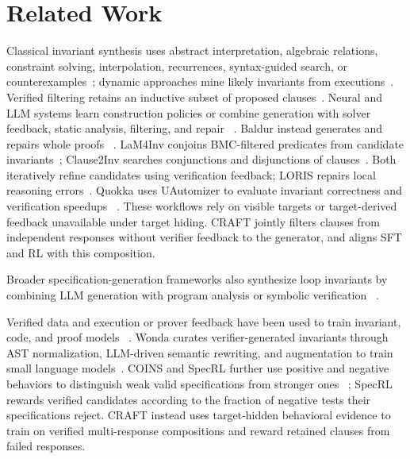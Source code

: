 \section{Related Work}\label{sec:related}

Classical invariant synthesis uses abstract interpretation, algebraic relations,
constraint solving, interpolation, recurrences, syntax-guided search, or
counterexamples~\citep{cousot1977abstract,cousot1978automatic,karr1976affine,
colon2003linear,sankaranarayanan2004non,gulwani2008program,gupta2009invgen,
mcmillan2003interpolation,kincaid2017compositional,alur2013sygus,garg2014ice};
dynamic approaches mine likely invariants from executions~\citep{daikon}.
Verified filtering retains an inductive subset of proposed
clauses~\citep{flanagan2001houdini}.  Neural and LLM systems learn construction
policies or combine generation with solver feedback, static analysis,
filtering, and repair
~\citep{si2018learning,si2020code2inv,ryan2020cln2inv,yao2020gcln,
yu2023lipus,kamath2024leveraging,chakraborty2023ranking,
liu2026acinv,
wu2024lemur}. Baldur instead generates and repairs whole proofs
~\citep{first2023baldur}. LaM4Inv conjoins BMC-filtered predicates
from candidate invariants~\citep{wu2024lam4inv}; Clause2Inv searches
conjunctions and disjunctions of clauses~\citep{cao2025clause2inv}.
Both iteratively refine candidates using verification feedback; LORIS repairs
local reasoning errors~\citep{li2026loris}. Quokka uses UAutomizer
to evaluate invariant correctness and verification speedups
~\citep{wei2026quokka}.  These workflows rely on visible targets or
target-derived feedback unavailable under target hiding.
CRAFT jointly filters clauses from independent responses without verifier
feedback to the generator, and aligns SFT and RL with this composition.

Broader specification-generation frameworks also synthesize loop invariants
by combining LLM generation with
program analysis or symbolic verification
~\citep{wen2024enchanting,yang2025sespec,ma2025specgen}.

Verified data and execution or prover feedback have been used to train
invariant, code, and proof models
~\citep{wei2026quokka,pinto2026notall,le2022coderl,yan2026reform}.
Wonda curates verifier-generated invariants through AST normalization,
LLM-driven semantic rewriting, and augmentation to train small language
models~\citep{pinto2026notall}.
COINS and SpecRL further use positive and negative behaviors to distinguish
weak valid specifications from stronger ones
~\citep{yang2026coins,huang2026specrl}; SpecRL rewards verified candidates
according to the fraction of negative tests their specifications reject.
CRAFT instead uses target-hidden behavioral evidence to train on verified
multi-response compositions and reward retained clauses from failed responses.

